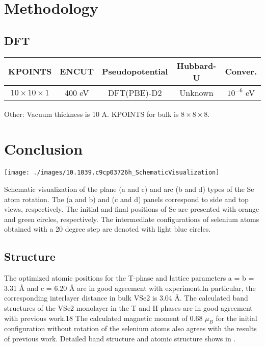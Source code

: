 \section{Methodology}


\subsection{DFT}
\begin{table}[h]
    \begin{tabular}{ccccc}
    \toprule
    KPOINTS                 & ENCUT  & Pseudopotential & Hubbard-U & Conver.      \\
    \midrule
    $10 \times 10 \times 1$ & 400 eV & DFT(PBE)-D2     & Unknown   & $10^{-6}$ eV \\
    \bottomrule
    \end{tabular}
\end{table}
Other: Vacuum thickness is 10 A. KPOINTS for bulk is $8 \times 8 \times 8$.
\section{Conclusion}
\begin{marginfigure}
    \texttt{[image: ./images/10.1039.c9cp03726h\_SchematicVisualization]}
	\caption[Schematic visualization of the plane and arc types of the Se atom rotation]{
        Schematic visualization of the plane (a and c) and arc (b and d) types of the Se atom rotation. The (a and b) and (c and d) panels correspond to side and top views, respectively. The initial and final positions of Se are presented with orange and green circles, respectively. The intermediate configurations of selenium atoms obtained with a 20 degree step are denoted with light blue circles.
	}
\end{marginfigure}
\subsection{Structure}
The optimized atomic positions for the T-phase and lattice parameters a = b = 3.31 Å and c = 6.20 Å are in good agreement with experiment.In particular, the corresponding interlayer distance in bulk VSe2 is 3.04 Å. The calculated band structures of the VSe2 monolayer in the T and H phases are in good agreement with previous work.18 The calculated magnetic moment of 0.68 $\mu_B$ for the initial configuration without rotation of the selenium atoms also agrees with the results of previous work. Detailed band structure and atomic structure shows in .

